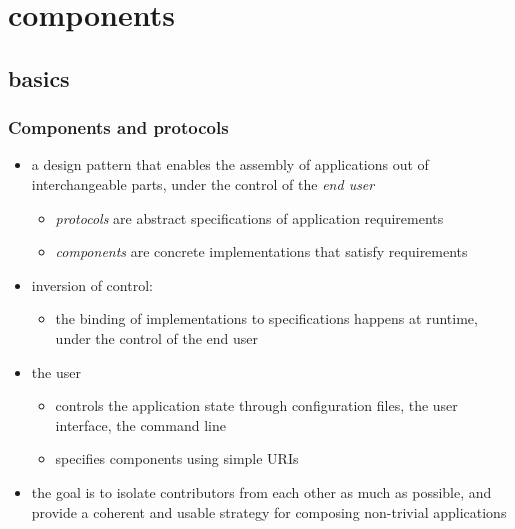 %
%


\section{components}
\subsection{basics}

\begin{frame}
%
  \frametitle{Components and protocols}
%
  \begin{itemize}
%
    \item a design pattern that enables the assembly of applications out of interchangeable
      parts, under the control of the {\em end user}
      \begin{itemize}
      \item {\em protocols} are abstract specifications of application requirements
      \item {\em components} are concrete implementations that satisfy requirements
      \end{itemize}
%
    \item inversion of control:
      \begin{itemize}
      \item the binding of implementations to specifications happens at runtime, under the
        control of the end user
      \end{itemize}
%
    \item the user
      \begin{itemize}
      \item controls the application state through configuration files, the user interface, the
        command line
      \item specifies components using simple URIs
      \end{itemize}
%
    \item the goal is to isolate contributors from each other as much as possible, and provide
      a coherent and usable strategy for composing non-trivial applications
%
  \end{itemize}
%
\end{frame}

